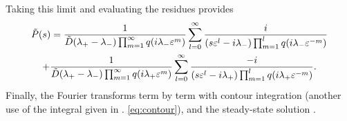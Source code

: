 Taking this limit and evaluating the residues provides 
\DIFdelbegin %
\DIFdelend \DIFaddbegin \begin{multline} \tilde{P}(s) = \frac{1}{\tilde{D}(\lambda_+ - \lambda_-) \prod_{m=1}^\infty q(i \lambda_- \varepsilon^m)} \sum_{l=0}^\infty \frac{i}{(s\varepsilon^l-i\lambda_-)\prod_{m=1}^l q(i\lambda_- \varepsilon^{-m})} 
	\\+ \frac{1}{\tilde{D}(\lambda_+ - \lambda_-) \prod_{m=1}^\infty q(i \lambda_+ \varepsilon^m)} \sum_{l=0}^\infty \frac{-i}{(s\varepsilon^l-i \lambda_+)\prod_{m=1}^l q(i\lambda_+ \varepsilon^{-m})}. \end{multline}\DIFaddend 
Finally, \DIFdelbegin {}\DIFdelend the Fourier transforms \DIFaddbegin {}\DIFaddend term by term with contour integration (another use of the integral given in \DIFdelbegin {}\DIFdelend \DIFaddbegin {}\DIFaddend . \ref{eq:contour}), and \DIFdelbegin {}\DIFdelend \DIFaddbegin {}\DIFaddend the steady-state solution \DIFdelbegin \DIFdel{(\ref{eq:steadystate})}\DIFdelend \DIFaddbegin {}\DIFaddend .

